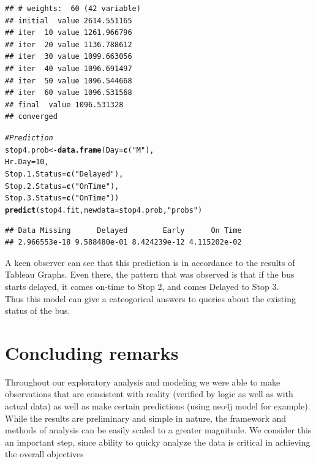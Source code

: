 \documentclass[12pt]{article}\usepackage[]{graphicx}\usepackage[]{color}
\makeatletter
\newcommand{\hlnum}[1]{\textcolor[rgb]{0.686,0.059,0.569}{#1}}%
\newcommand{\hlstr}[1]{\textcolor[rgb]{0.192,0.494,0.8}{#1}}%
\newcommand{\hlcom}[1]{\textcolor[rgb]{0.678,0.584,0.686}{\textit{#1}}}%
\newcommand{\hlstd}[1]{\textcolor[rgb]{0.345,0.345,0.345}{#1}}%
\newcommand{\hlkwb}[1]{\textcolor[rgb]{0.69,0.353,0.396}{#1}}%
\newcommand{\hlkwc}[1]{\textcolor[rgb]{0.333,0.667,0.333}{#1}}%
\newcommand{\hlkwd}[1]{\textcolor[rgb]{0.737,0.353,0.396}{\textbf{#1}}}%
\newenvironment{kframe}{%
 \def\at@end@of@kframe{}%
 \ifinner\ifhmode%
  \def\at@end@of@kframe{\end{minipage}}%
  \begin{minipage}{\columnwidth}%
 \fi\fi%
 \def\FrameCommand##1{\hskip\@totalleftmargin \hskip-\fboxsep
 \colorbox{shadecolor}{##1}\hskip-\fboxsep
     \hskip-\linewidth \hskip-\@totalleftmargin \hskip\columnwidth}%
 \MakeFramed {\advance\hsize-\width
   \@totalleftmargin\z@ \linewidth\hsize
   \@setminipage}}%
 {\par\unskip\endMakeFramed%
 \at@end@of@kframe}
\newenvironment{knitrout}{}{} %
\makeatother
\begin{document}
\begin{knitrout}
\begin{kframe}
\begin{alltt}
\end{alltt}
\begin{verbatim}
## # weights:  60 (42 variable)
## initial  value 2614.551165 
## iter  10 value 1261.966796
## iter  20 value 1136.788612
## iter  30 value 1099.663056
## iter  40 value 1096.691497
## iter  50 value 1096.544668
## iter  60 value 1096.531568
## final  value 1096.531328 
## converged
\end{verbatim}
\begin{alltt}
\hlcom{#Prediction}
\hlstd{stop4.prob}\hlkwb{<-}\hlkwd{data.frame}\hlstd{(}\hlkwc{Day}\hlstd{=}\hlkwd{c}\hlstd{(}\hlstr{"M"}\hlstd{),}
                                           \hlkwc{Hr.Day}\hlstd{=}\hlnum{10}\hlstd{,}
                                           \hlkwc{Stop.1.Status}\hlstd{=}\hlkwd{c}\hlstd{(}\hlstr{"Delayed"}\hlstd{),}
                                           \hlkwc{Stop.2.Status}\hlstd{=}\hlkwd{c}\hlstd{(}\hlstr{"On Time"}\hlstd{),}
                                           \hlkwc{Stop.3.Status}\hlstd{=}\hlkwd{c}\hlstd{(}\hlstr{"On Time"}\hlstd{))}
\hlkwd{predict}\hlstd{(stop4.fit,}\hlkwc{newdata} \hlstd{= stop4.prob,}\hlstr{"probs"}\hlstd{)}
\end{alltt}
\begin{verbatim}
## Data Missing      Delayed        Early      On Time 
## 2.966553e-18 9.588480e-01 8.424239e-12 4.115202e-02
\end{verbatim}
\end{kframe}
\end{knitrout}
A keen observer can see that this prediction is in accordance to the results of Tableau Graphs. Even there, the pattern that was observed is that if the bus starts delayed, it comes on-time to Stop 2, and comes Delayed to Stop 3.\\

Thus this model can give a cateogorical answers to queries about the existing status of the bus.\\

\section{Concluding remarks}
Throughout our exploratory analysis and modeling we were able to make observations that are consistent with reality (verified by logic as well as with actual data) as well as make certain predictions (using neo4j model for example). While the results are preliminary and simple in nature, the framework and methods of analysis can be easily scaled to a greater magnitude. We consider this an important step, since ability to quicky analyze the data is critical in achieving the overall objectives
\end{document}
